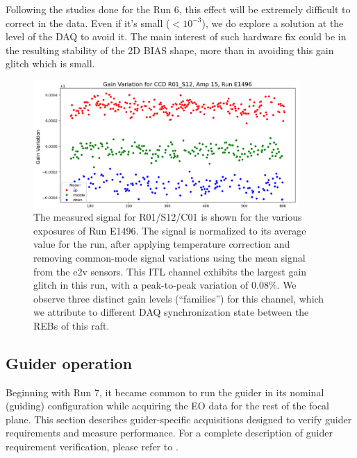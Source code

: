 Following the studies done for the Run 6, this effect will be extremely difficult to correct in the data. Even if it's small ($<10^{-3}$), we do explore a solution at the level of the DAQ to avoid it. The main interest of such hardware fix could be in the resulting  stability of the 2D BIAS shape, more than in avoiding this gain glitch which is small. 

\begin{figure}[ht]
\begin{centering}
\includegraphics[width=0.9\textwidth]{figures/Gain_variation_R01_S12_amp15_E1496.png}
\end{centering}
\caption{The measured signal for R01/S12/C01 is shown for the various exposures of Run E1496. The signal is normalized to its average value for the run, after applying temperature correction and removing common-mode signal variations using the mean signal from the e2v sensors. This ITL channel exhibits the largest gain glitch in this run, with a peak-to-peak variation of 0.08\%. We observe three distinct gain levels (“families”) for this channel, which we attribute to different DAQ synchronization state between the REBs of this raft.}
\label{fig:ITLGglitch}
\end{figure}

\subsection{Guider operation}\label{guider-operation}
Beginning with Run 7, it became common to run the guider in its nominal (guiding) configuration while acquiring the EO data for the rest of the focal plane. This section describes guider-specific acquisitions designed to verify guider requirements and measure performance. For a complete description of guider requirement verification, please refer to \citep{LCA-20583}.

